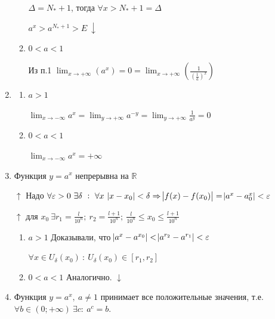 \documentclass{article}
\begin{document}
\begin{enumerate}
\begin{enumerate}
            \(\Delta = N_* + 1\), тогда \(\forall x > N_* + 1 = \Delta\)

            \(a^x > a^{N_*+1} > E\ \downarrow\)
                        
            \item \(0 < a < 1\)

            Из п.1 \( \lim_{x \to +\infty}(a^x) = 0 = \lim_{x \to +\infty}(\frac{1}{(\frac{1}{a})^x}) \)
        \end{enumerate}

        \item
        \begin{enumerate}
            \item \( a > 1 \)
            
            \( \lim_{x \to -\infty} a^x = \lim_{y \to +\infty} a^{-y} = \lim_{y \to +\infty} \frac{1}{a^y} = 0 \)
            
            \item \( 0 < a < 1 \) 
            
            \( \lim_{x \to -\infty} a^x = +\infty \)
        \end{enumerate}
        
        \item Функция \(y = a^x\) непрерывна на \(\mathbb{R}\)

        \(\uparrow\) Надо \(\forall \varepsilon > 0\ \exists \delta\ :\ \forall x\ \abs{x - x_0} < \delta \Rightarrow \abs{f(x) - f(x_0)} = \abs{a^x-a^x_0} < \varepsilon\)

        \(\uparrow\) для \(x_0\ \exists r_1 = \frac{l}{10^n};\ r_2 = \frac{l + 1}{10^n};\ \frac{l}{10^n} \leq x_0 \leq \frac{l + 1}{10^n} \)
        
        \begin{enumerate}
            \item \( a > 1 \) Доказывали, что \( \abs{a^x - a^{x_0}} < \abs{a^{r_2} - a^{r_1}} < \varepsilon \)
        
            \(\forall x \in U_{\delta}(x_0)\ :\ U_{\delta}(x_0) \in [r_1, r_2]\)

            \item \( 0 < a < 1 \) Аналогично. \(\downarrow\)
        \end{enumerate}
        
        \item Функция \(y = a^x,\ a \neq 1\) принимает все положительные значения, т.е. \(\forall b \in (0; +\infty)\ \exists c:\ a^c = b\).


\end{enumerate}
\end{document}
